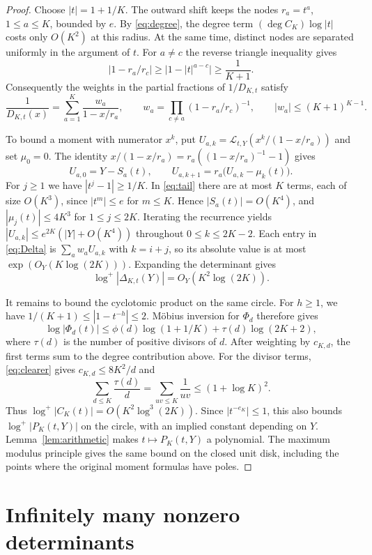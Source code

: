 \documentclass[11pt,letterpaper]{article}
\numberwithin{equation}{section}
\begin{document}
\begin{proof}
Choose \(|t|=1+1/K\). The outward shift keeps the nodes
\(r_a=t^a\), \(1\le a\le K\), bounded by \(e\). By \eqref{eq:degree},
the degree term \((\deg C_K)\log|t|\) costs only \(O(K^2)\) at this
radius. At the same time,
distinct nodes are separated uniformly in the argument of \(t\). For
\(a\ne c\) the reverse triangle inequality gives
\[
    |1-r_a/r_c|\ge \big|1-|t|^{a-c}\big|\ge \frac1{K+1}.
\]
Consequently the weights in the partial fractions of \(1/D_{K,t}\)
satisfy
\[
 \frac1{D_{K,t}(x)}=\sum_{a=1}^K\frac{w_a}{1-x/r_a},
 \qquad w_a=\prod_{c\ne a}(1-r_a/r_c)^{-1},
 \qquad |w_a|\le(K+1)^{K-1}.
\]

To bound a moment with numerator \(x^k\), put
\(U_{a,k}=\mathcal L_{t,Y}(x^k/(1-x/r_a))\) and set \(\mu_0=0\).
The identity \(x/(1-x/r_a)=r_a((1-x/r_a)^{-1}-1)\) gives
\[
 U_{a,0}=Y-S_a(t),\qquad
 U_{a,k+1}=r_a\bigl(U_{a,k}-\mu_k(t)\bigr).
\]
For \(j\ge1\) we have \(|t^j-1|\ge1/K\). In \eqref{eq:tail}
there are at most \(K\) terms, each of size \(O(K^3)\), since
\(|t^m|\le e\) for \(m\le K\). Hence \(|S_a(t)|=O(K^4)\), and
\(|\mu_j(t)|\le4K^3\) for \(1\le j\le2K\).
Iterating the recurrence yields
\(|U_{a,k}|\le e^{2K}(|Y|+O(K^4))\) throughout \(0\le k\le2K-2\).
Each entry in \eqref{eq:Delta} is \(\sum_a w_aU_{a,k}\) with
\(k=i+j\), so its absolute value is at most \(\exp(O_Y(K\log(2K)))\).
Expanding the determinant gives
\[
                \log^+|\Delta_{K,t}(Y)|=O_Y(K^2\log(2K)).
\]

It remains to bound the cyclotomic product on the same circle.
For \(h\ge1\), we have \(1/(K+1)\le |1-t^{-h}|\le2\).
Möbius inversion for \(\Phi_d\) therefore gives
\[
 \log|\Phi_d(t)|\le
    \phi(d)\log(1+1/K)+\tau(d)\log(2K+2),
\]
where \(\tau(d)\) is the number of positive divisors of \(d\).
After weighting by \(c_{K,d}\), the first terms sum to the degree
contribution above. For the divisor terms, \eqref{eq:clearer}
gives \(c_{K,d}\le8K^2/d\)
and
\[
 \sum_{d\le K}\frac{\tau(d)}d
   =\sum_{uv\le K}\frac1{uv}\le (1+\log K)^2.
\]
Thus \(\log^+|C_K(t)|=O(K^2\log^3(2K))\). Since
\(|t^{-e_K}|\le1\), this also bounds \(\log^+|P_K(t,Y)|\)
on the circle, with an implied constant depending on \(Y\).
Lemma~\ref{lem:arithmetic} makes \(t\mapsto P_K(t,Y)\) a polynomial.
The maximum modulus principle gives the same bound on the closed unit
disk, including the points where the original moment formulas have poles.
\end{proof}

\section{Infinitely many nonzero determinants}\label{sec:nonzero}
\end{document}
